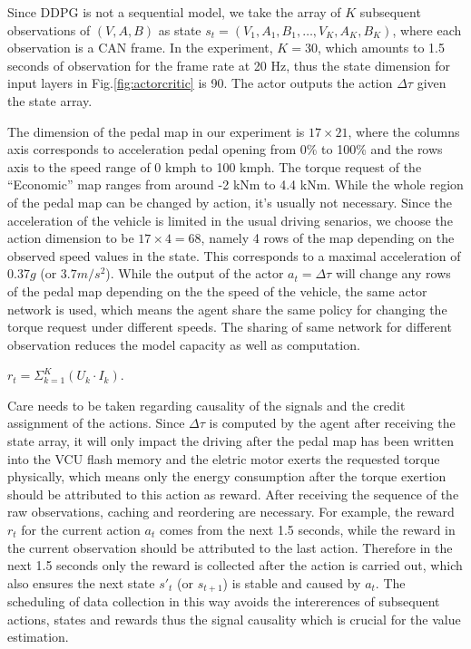 \documentclass[conference]{IEEEtran}
\begin{document}
\begin{description}
	\item[State $s_t$]
        \item Since DDPG is not a sequential model, we take the array of $K$ subsequent observations of $(V,A,B)$ as state $s_{t}=(V_{1},A_{1},B_{1},\ldots,V_{K},A_{K},B_{K})$, where each observation is a CAN frame. In the experiment, $K=30$, which amounts to 1.5 seconds of observation for the frame rate at 20 Hz, thus the state dimension for input layers in Fig.\@\ref{fig:actorcritic} is 90. The actor outputs the action $\Delta\tau$ given the state array.
	\item[Action $a_t$]
        \item The dimension of the pedal map in our experiment is $17\times 21$, where the columns axis corresponds to acceleration pedal opening from 0\% to 100\% and the rows axis to the speed range of 0 kmph to 100 kmph. The torque request of the ``Economic'' map ranges from around -2 kNm to 4.4 kNm. While the whole region of the pedal map can be changed by action, it's usually not necessary. Since the acceleration of the vehicle is limited in the usual driving senarios, we choose the action dimension to be $17\times 4=68$, namely 4 rows of the map depending on the observed speed values in the state.  This corresponds to a maximal acceleration of 0.37$g$ (or $3.7m/s^{2}$). While the output of the actor $a_{t}=\Delta\tau$ will change any rows of the pedal map depending on the the speed of the vehicle, the same actor network is used, which means the agent share the same policy for changing the torque request under different speeds. The sharing of same network for different observation reduces the model capacity as well as computation.

	\item[Reward]
        \item $r_{t}=\Sigma_{k=1}^{K}(U_{k}\cdot I_{k})$.

	\item[Causality]
        \item Care needs to be taken regarding causality of the signals and the credit assignment of the actions. Since $\Delta\tau$ is computed by the agent after receiving the state array, it will only impact the driving after the pedal map has been written into the VCU flash memory and the eletric motor exerts the requested torque physically, which means only the energy consumption after the torque exertion should be attributed to this action as reward. After receiving the sequence of the raw observations, caching and reordering are necessary. For example, the reward $r_{t}$ for the current action $a_{t}$ comes from the next 1.5 seconds, while the reward in the current observation should be attributed to the last action. Therefore in the next 1.5 seconds only the reward is collected after the action is carried out, which also ensures the next state $s'_{t}$ (or $s_{t+1}$) is stable and caused by $a_{t}$. The scheduling of data collection in this way avoids the intererences of subsequent actions, states and rewards thus the signal causality which is crucial for the value estimation.


\end{description}
\end{document}
